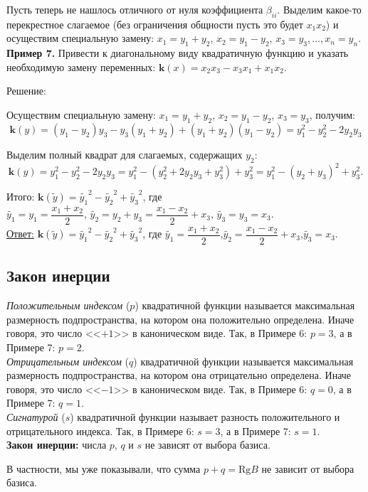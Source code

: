 Пусть теперь не нашлось отличного от нуля коэффициента $\beta_{ii}$. Выделим какое-то перекрестное слагаемое (без ограничения общности пусть это будет $x_1x_2$) и осуществим специальную замену: $x_1=y_1+y_2$, $x_2=y_1-y_2$, $x_3=y_3, \ldots, x_n=y_n$. \\

\textbf{Пример 7.} Привести к диагональному виду квадратичную функцию и указать необходимую замену переменных: $\mathbf{k}(x)=x_2x_3-x_3x_1+x_1x_2.$

\begin{center}
Решение:
\end{center}

Осуществим специальную замену: $x_1=y_1+y_2$, $x_2=y_1-y_2$, $x_3=y_3$, получим:$$\mathbf{k}(y)=(y_1-y_2)y_3-y_3(y_1+y_2)+(y_1+y_2)(y_1-y_2)=y^2_1-y_2^2-2y_2y_3$$

Выделим полный квадрат для слагаемых, содержащих $y_2$:$$\mathbf{k}(y)=y^2_1-y_2^2-2y_2y_3=y^2_1-(y_2^2+2y_2y_3+y^2_3)+y^2_3=y^2_1-(y_2+y_3)^2+y^2_3.$$

Итого: $\mathbf{k}(\widetilde{y})=\widetilde{y_1}^2-\widetilde{y_2}^2+\widetilde{y_3}^2$, где\\

$\widetilde{y_1}=y_1=\dfrac{x_1+x_2}{2}$, $\widetilde{y_2}=y_2+y_3=\dfrac{x_1-x_2}{2}+x_3$, $\widetilde{y_3}=y_3=x_3$.\\

\underline{Ответ:} $\mathbf{k}(\widetilde{y})=\widetilde{y_1}^2-\widetilde{y_2}^2+\widetilde{y_3}^2$, где $\widetilde{y_1}=\dfrac{x_1+x_2}{2}$,\hspace{8pt}$\widetilde{y_2}=\dfrac{x_1-x_2}{2}+x_3$,\hspace{8pt}$\widetilde{y_3}=x_3$.

\subsection{Закон инерции}
\textit{Положительным индексом} ($p$) квадратичной функции называется максимальная размерность подпространства, на котором она положительно определена. Иначе говоря, это число <<$+1$>> в каноническом виде. Так, в Примере 6: $p=3$, а в Примере 7: $p=2$.\\

\textit{Отрицательным индексом} ($q$) квадратичной функции называется максимальная размерность подпространства, на котором она отрицательно определена. Иначе говоря, это число <<$-1$>> в каноническом виде. Так, в Примере 6: $q=0$, а в Примере 7: $q=1$.\\

\textit{Сигнатурой} ($s$) квадратичной функции называет разность положительного и отрицательного индекса. Так, в Примере 6: $s=3$, а в Примере 7: $s=1$.\\

\textbf{Закон инерции:} числа $p$, $q$ и $s$ не зависят от выбора базиса.

В частности, мы уже показывали, что сумма $p+q=\mathrm{Rg}B$ не зависит от выбора базиса.\\

